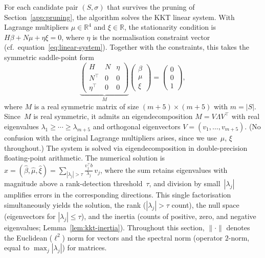 
For each candidate pair $(S, \sigma)$ that survives
the pruning of Section~\ref{app:pruning},
the algorithm solves the KKT linear system.
With Lagrange multipliers $\mu \in \mathbb{R}^4$
and $\xi \in \mathbb{R}$,
the stationarity condition is
$H\beta + N\mu + \eta\xi = 0$,
where $\eta$ is the normalisation constraint vector
(cf.\ equation~\eqref{eq:linear-system}).
Together with the constraints,
this takes the symmetric saddle-point form
\begin{equation}\label{eq:kkt-system}
  \underbrace{\begin{pmatrix} H & N & \eta \\[3pt]
    N^\top & 0 & 0 \\[3pt]
    \eta^\top & 0 & 0 \end{pmatrix}}_{M}
  \begin{pmatrix} \beta \\ \mu \\ \xi \end{pmatrix}
  = \begin{pmatrix} 0 \\ 0 \\ 1 \end{pmatrix},
\end{equation}
where $M$ is a real symmetric matrix of size
$(m + 5) \times (m + 5)$ with $m = |S|$.
Since~$M$ is real symmetric, it admits an eigendecomposition
$M = V \Lambda V^\top$ with real eigenvalues
$\lambda_1 \geq \cdots \geq \lambda_{m+5}$
and orthogonal eigenvectors $V = (v_1, \ldots, v_{m+5})$.
(No confusion with the original Lagrange multipliers arises,
since we use~$\mu$, $\xi$ throughout.)
The system is solved via eigendecomposition in double-precision
floating-point arithmetic.
The numerical solution is
$\hat x = (\hat\beta, \hat\mu, \hat\xi)
  = \sum_{|\lambda_j| > \tau}
    \frac{v_j^\top b}{\lambda_j}\, v_j$,
where the sum retains eigenvalues with magnitude above a
rank-detection threshold~$\tau$, and division by
small~$|\lambda_j|$ amplifies errors in the corresponding
directions.
This single factorisation simultaneously yields the
solution, the rank ($|\lambda_j| > \tau$ count),
the null space (eigenvectors for $|\lambda_j| \leq \tau$),
and the inertia (counts of positive, zero, and negative
eigenvalues; Lemma~\ref{lem:kkt-inertia}).
Throughout this section, $\|\cdot\|$ denotes the Euclidean
($\ell^2$) norm for vectors and the spectral norm
(operator $2$-norm, equal to $\max_j |\lambda_j|$)
for matrices.

